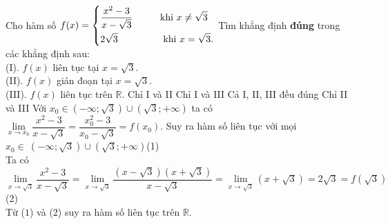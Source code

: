 \begin{ex}%
	Cho hàm số $f(x)=\left\{\begin{aligned}&\dfrac{x^2-3}{x-\sqrt{3}} \hspace{1cm} \text{khi } x\ne \sqrt{3}\\&2\sqrt{3} \hspace{1.65cm} \text{khi } x=\sqrt{3}.\end{aligned}\right.$ Tìm khẳng định \textbf{đúng} trong các khẳng định sau:\\
	(I). $f(x)$ liên tục tại $x=\sqrt{3}$.\\
	(II). $f(x)$ gián đoạn tại $x=\sqrt{3}$.\\
	(III). $f(x)$ liên tục trên $\mathbb{R}$.
	\choice
	{Chỉ I và II}
	{\True Chỉ I và III}
	{Cả I, II, III đều đúng}
	{Chỉ II và III}
	\loigiai
	{
		Với $x_0\in \left(-\infty;\sqrt{3}\right)\cup \left(\sqrt{3};+\infty\right)$ ta có $\lim\limits_{x\rightarrow x_0}\dfrac{x^2-3}{x-\sqrt{3}}=\dfrac{x_0^2-3}{x_0-\sqrt{3}}=f(x_0)$. Suy ra hàm số liên tục với mọi $x_0\in\ \left(-\infty;\sqrt{3}\right)\cup \left(\sqrt{3};+\infty\right)$\quad(1)\\
		Ta có $\lim\limits_{x\rightarrow \sqrt{3}}\dfrac{x^2-3}{x-\sqrt{3}}=\lim\limits_{x\rightarrow \sqrt{3}}\dfrac{\left(x-\sqrt{3}\right)\left(x+\sqrt{3}\right)}{x-\sqrt{3}}=\lim\limits_{x\rightarrow \sqrt{3}} \left(x+\sqrt{3}\right)=2\sqrt{3}=f(\sqrt{3})$ \quad(2)\\
		Từ ($1$) và ($2$) suy ra hàm số liên tục trên $\mathbb{R}$.
	}
\end{ex} 

